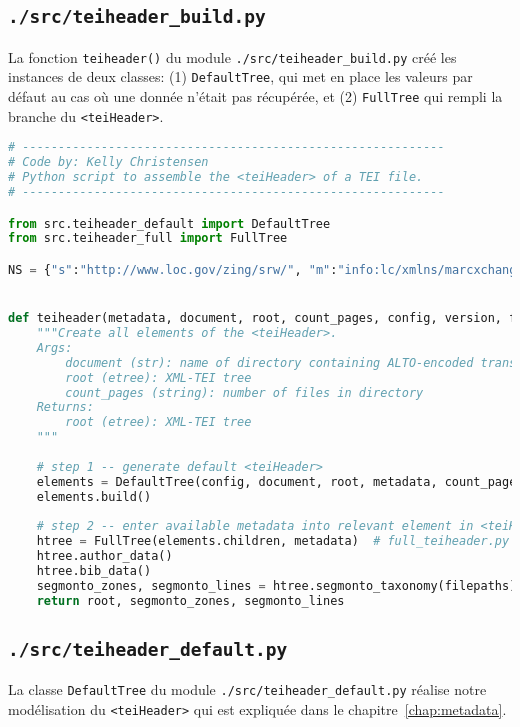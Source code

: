 \documentclass[class=article, crop=false]{standalone}
\begin{document}
\subsection{\texttt{./src/teiheader\_build.py}}
La fonction \texttt{teiheader()} du module \texttt{./src/teiheader\_build.py} créé les instances de deux classes: (1) \texttt{DefaultTree}, qui met en place les valeurs par défaut au cas où une donnée n'était pas récupérée, et (2) \texttt{FullTree} qui rempli la branche du \texttt{<teiHeader>}.

\begin{lstlisting}[language=python, style=python]
# -----------------------------------------------------------
# Code by: Kelly Christensen
# Python script to assemble the <teiHeader> of a TEI file.
# -----------------------------------------------------------

from src.teiheader_default import DefaultTree
from src.teiheader_full import FullTree

NS = {"s":"http://www.loc.gov/zing/srw/", "m":"info:lc/xmlns/marcxchange-v2"}


def teiheader(metadata, document, root, count_pages, config, version, filepaths, segmonto_zones, segmonto_lines):
    """Create all elements of the <teiHeader>.
    Args:
        document (str): name of directory containing ALTO-encoded transcriptions of the document's pages
        root (etree): XML-TEI tree
        count_pages (string): number of files in directory
    Returns:
        root (etree): XML-TEI tree
    """    
    
    # step 1 -- generate default <teiHeader>
    elements = DefaultTree(config, document, root, metadata, count_pages, version)  # deafult_teiheader.py
    elements.build()
    
    # step 2 -- enter available metadata into relevant element in <teiHeader>
    htree = FullTree(elements.children, metadata)  # full_teiheader.py
    htree.author_data()
    htree.bib_data()
    segmonto_zones, segmonto_lines = htree.segmonto_taxonomy(filepaths)
    return root, segmonto_zones, segmonto_lines

\end{lstlisting}

\subsection{\texttt{./src/teiheader\_default.py}}
La classe \texttt{DefaultTree} du module \texttt{./src/teiheader\_default.py} réalise notre modélisation du \texttt{<teiHeader>} qui est expliquée dans le chapitre~\ref{chap:metadata}.
\end{document}
